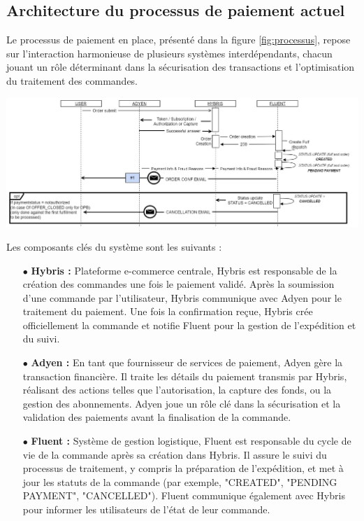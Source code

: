 \subsection{Architecture du processus de paiement actuel}
Le processus de paiement en place, présenté dans la figure \ref{fig:processus}, repose sur l'interaction harmonieuse de plusieurs systèmes interdépendants, chacun jouant un rôle déterminant dans la sécurisation des transactions et l'optimisation du traitement des commandes. 
\begin{center}
    \centering
    \includegraphics[width=19cm]{Figures/processus.jpeg}
    \label{fig:processus}
\end{center}
Les composants clés du système sont les suivants :
\begin{itemize}
    \item [$\bullet$]\textbf{Hybris :} Plateforme e-commerce centrale, Hybris est responsable de la création des commandes une fois le paiement validé. Après la soumission d'une commande par l'utilisateur, Hybris communique avec Adyen pour le traitement du paiement. Une fois la confirmation reçue, Hybris crée officiellement la commande et notifie Fluent pour la gestion de l'expédition et du suivi.
    \item [$\bullet$]\textbf{Adyen :} En tant que fournisseur de services de paiement, Adyen gère la transaction financière. Il traite les détails du paiement transmis par Hybris, réalisant des actions telles que l'autorisation, la capture des fonds, ou la gestion des abonnements. Adyen joue un rôle clé dans la sécurisation et la validation des paiements avant la finalisation de la commande.
    \item [$\bullet$]\textbf{Fluent :} Système de gestion logistique, Fluent est responsable du cycle de vie de la commande après sa création dans Hybris. Il assure le suivi du processus de traitement, y compris la préparation de l'expédition, et met à jour les statuts de la commande (par exemple, "CREATED", "PENDING PAYMENT", "CANCELLED"). Fluent communique également avec Hybris pour informer les utilisateurs de l'état de leur commande.
\end{itemize}
